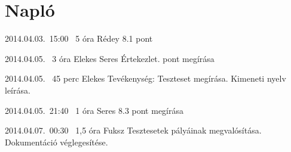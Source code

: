 %
\section{Napló}

\begin{naplo}
\bejegyzes
{2014.04.03.~15:00~}
{5 óra}
{Rédey}
{8.1 pont}

\bejegyzes
{2014.04.05.~}
{3 óra}
{Elekes \newline
Seres}
{Értekezlet. pont megírása}

\bejegyzes
{2014.04.05.~}
{45 perc}
{Elekes}
{Tevékenység:\newline
Teszteset megírása.\newline
Kimeneti nyelv leírása.}

\bejegyzes
{2014.04.05.~21:40~}
{1 óra}
{Seres}
{8.3 pont megírása}

\bejegyzes
{2014.04.07.~00:30~}
{1,5 óra}
{Fuksz}
{Tesztesetek pályáinak megvalósítása.\newline
Dokumentáció véglegesítése.}

\end{naplo}

